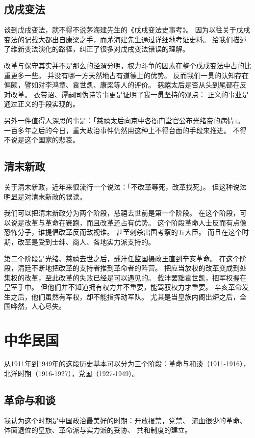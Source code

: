 \documentclass[12pt]{article}
\begin{document}
\subsection{戊戌变法}
谈到戊戌变法，就不得不说茅海建先生的《戊戌变法史事考》。
因为以往关于戊戌变法的记载大都出自康梁之手，而茅海建先生通过详细地考证史料。
给我们描述了维新变法演化的路径，纠正了很多对戊戌变法错误的理解。

改革与保守其实并不是那么的泾渭分明，权力斗争的因素在整个戊戌变法中占的比重更多一些。
并没有哪一方天然地占有道德上的优势。
反而我们一贯的认知存在偏颇，譬如对李鸿章、袁世凯、康梁等人的评价。
慈禧太后是否从头到尾都在反对改革。
衣带诏、谭嗣同伪诗等事更是证明了我一贯坚持的观点：
正义的事业是通过正义的手段实现的。

另外一件值得人深思的事是：「慈禧太后向京中各衙门堂官公布光绪帝的病情」。
一百多年之后的今日，重大政治事件仍然用这种上不得台面的手段来推进。
不得不说是这个国家的悲哀。

\subsection{清末新政}
关于清末新政，近年来很流行一个说法：「不改革等死，改革找死」。
但这种说法明显是对清末新政的误读。

我们可以把清末新政分为两个阶段，慈禧去世前是第一个阶段。
在这个阶段，可以说是改革与革命在赛跑，而且改革还占有优势。
这个阶段革命人士反而有点像恐怖分子，谁提倡改革反而敌视谁。
甚至刺杀出国考察的五大臣。
而且在这个时期，改革是受到士绅、商人、各地实力派支持的。

第二个阶段是光绪、慈禧去世之后，载沣任监国摄政王直到辛亥革命。
在这个阶段，清廷不断地把改革的支持者推到革命者的阵营。
把应当放权的改革变成到处集权的改革，至此改革的失败已经是可以遇见的。
载沣罢黜袁世凯，把军权握在皇室手中。
但他们并不知道拥有权力并不重要，能驾驭权力才重要。
辛亥革命发生之后，他们虽然有军权，却不能指挥动军队。
尤其是当皇族内阁出炉之后，全国哗然，人心尽失。
\section{中华民国}
从1911年到1949年的这段历史基本可以分为三个阶段：革命与和谈（1911-1916），北洋时期（1916-1927），党国（1927-1949）。
\subsection{革命与和谈}
我认为这个时期是中国政治最美好的时期：开放报禁，党禁、
流血很少的革命、体面退位的皇族、革命派与实力派的妥协、
共和制度的建立。
\end{document}
